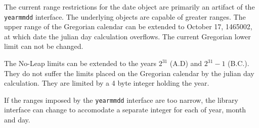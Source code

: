 
The current range restrictions for the date object are primarily an artifact of
the {\tt yearmmdd} interface.  The underlying objects are capable of greater ranges.
The upper range of the Gregorian calendar can be extended to October 17, 1465002, 
at which date the julian day calculation overflows.  The current Gregorian lower limit 
can not be changed.

The No-Leap limits can be extended to the years \( 2^{31} \) (A.D) and \( 2^{31} - 1 \) (B.C.).  
They do not suffer the limits placed on the Gregorian calendar by the julian day 
calculation.  They are limited by a 4 byte integer holding the year.

If the ranges imposed by the {\tt yearmmdd} interface are too narrow, the library interface
can change to accomodate a separate integer for each of year, month and day.
